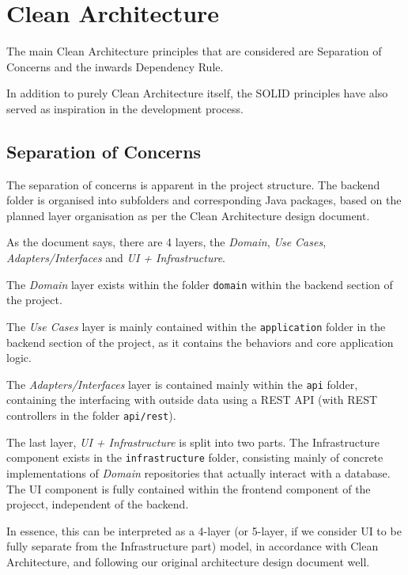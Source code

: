 \newpage

\section{Clean Architecture}

The main Clean Architecture principles that are considered are Separation of Concerns and the inwards Dependency Rule.

In addition to purely Clean Architecture itself, the SOLID principles have also served as inspiration in the development process.

\subsection{Separation of Concerns}

The separation of concerns is apparent in the project structure.
The backend folder is organised into subfolders and corresponding Java packages, 
based on the planned layer organisation as per the Clean Architecture design document.

As the document says, there are 4 layers, the \textit{Domain}, \textit{Use Cases}, \textit{Adapters/Interfaces} and \textit{UI + Infrastructure}.

The \textit{Domain} layer exists within the folder \verb|domain| within the backend section of the project.

The \textit{Use Cases} layer is mainly contained within the \verb|application| folder in the backend section of the project,
as it contains the behaviors and core application logic.

The \textit{Adapters/Interfaces} layer is contained mainly within the \verb|api| folder, containing the interfacing with outside data
using a REST API (with REST controllers in the folder \verb|api/rest|).

The last layer, \textit{UI + Infrastructure} is split into two parts.
The Infrastructure component exists in the \verb|infrastructure| folder, consisting mainly of concrete implementations
of \textit{Domain} repositories that actually interact with a database.
The UI component is fully contained within the frontend component of the projecct, independent of the backend.

In essence, this can be interpreted as a 4-layer (or 5-layer, if we consider UI to be fully separate from the Infrastructure part)
model, in accordance with Clean Architecture, and following our original architecture design document well.

